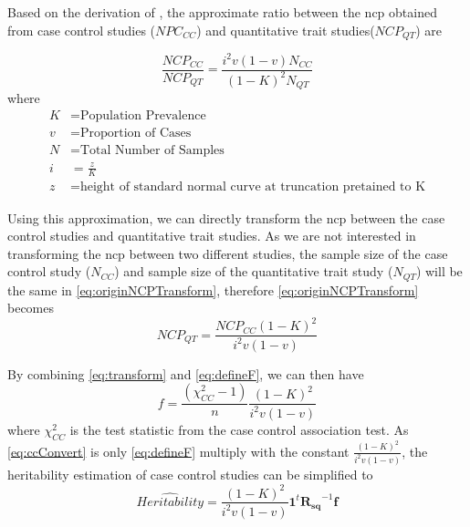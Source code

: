 			Based on the derivation of \citet{Yang2010}, the approximate ratio between the \gls{ncp} obtained from case control studies ($NPC_{CC}$) and quantitative trait studies($NCP_{QT}$) are
		
			\begin{equation}
			\frac{NCP_{CC}}{NCP_{QT}} = \frac{i^2v(1-v)N_{CC}}{(1-K)^2N_{QT}}
			\label{eq:originNCPTransform}
			\end{equation}
			where
			\begin{align*}
			 K &= \text{Population Prevalence} \\
			 v &= \text{Proportion of Cases}\\
			 N &= \text{Total Number of Samples}\\
			 i &= \frac{z}{K}\\
			 z &= \text{height of standard normal curve at truncation pretained to K}
			\end{align*}
			
			Using this approximation, we can directly transform the \gls{ncp} between the case control studies and quantitative trait studies.
			As we are not interested in transforming the \gls{ncp} between two different studies, the sample size of the case control study ($N_{CC}$) and sample size of the quantitative trait study ($N_{QT}$) will be the same in \cref{eq:originNCPTransform}, therefore \cref{eq:originNCPTransform} becomes
			\begin{equation}
			NCP_{QT} = \frac{NCP_{CC}(1-K)^2}{i^2v(1-v)}
			\label{eq:transform}
			\end{equation}
			
			By combining \cref{eq:transform} and \cref{eq:defineF}, we can then have
			\begin{equation}
			f = \frac{(\chi^2_{CC}-1)}{n}\frac{(1-K)^2}{i^2v(1-v)}
			\label{eq:ccConvert}
			\end{equation}
			where $\chi^2_{CC}$ is the test statistic from the case control association test.
			As \cref{eq:ccConvert} is only \cref{eq:defineF} multiply with the constant $\frac{(1-K)^2}{i^2v(1-v)}$, the heritability estimation of case control studies can be simplified to 
			\begin{equation}
			\hat{Heritability} =\frac{(1-K)^2}{i^2v(1-v)} \boldsymbol{1}^t\boldsymbol{R_{sq}}^{-1}\boldsymbol{f}
			\label{eq:caseControlHerit}
			\end{equation}
			
